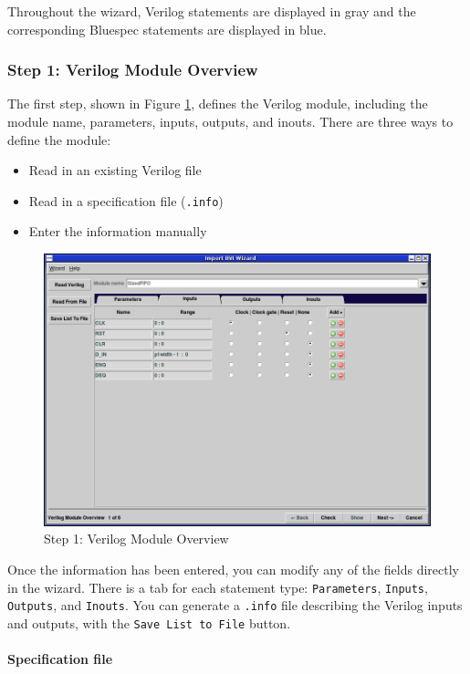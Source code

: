 \documentclass{article}
\newcommand{\te}[1]{\texttt{#1}}
\begin{document}
Throughout the wizard,  Verilog statements are displayed in gray and the
corresponding Bluespec statements are displayed in blue.


\subsubsection{Step 1: Verilog Module Overview}

The first step, shown in Figure \ref{fig-importbvi1},  defines the
Verilog module, including the module
name, parameters, inputs, outputs, and inouts.  There are three ways
to define the module:
\begin{itemize}
\item Read in an existing Verilog file
\item Read in a specification  file  (\te{.info})
\item Enter the information manually
\end{itemize}

\begin{figure}[htbp]
\begin{center}
\includegraphics[width = 4.5 in]{figures/importbvi1}
\caption{Step 1: Verilog Module Overview }
\label{fig-importbvi1}
\end{center}
\end{figure}

Once the information has been entered, you can modify any of the
fields directly in the wizard.  There is a tab for each statement
type: \te{Parameters}, \te{Inputs}, \te{Outputs}, and \te{Inouts}.
You can generate a \te{.info} file describing the Verilog inputs and
outputs, with the \te{Save List to File} button.


\paragraph{Specification file}
\end{document}
